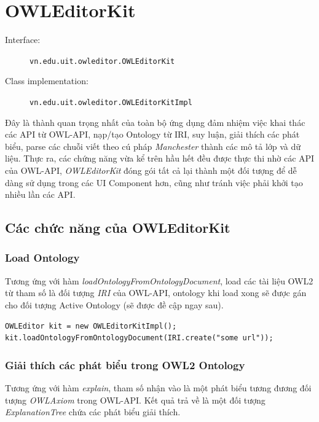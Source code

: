 \section{OWLEditorKit}
\begin{description}
\item[Interface:] \verb|vn.edu.uit.owleditor.OWLEditorKit|
\item[Class implementation:] \verb|vn.edu.uit.owleditor.OWLEditorKitImpl|
\end{description}
Đây là thành quan trọng nhất của toàn bộ ứng dụng đảm nhiệm việc khai thác các API từ OWL-API, nạp/tạo Ontology từ IRI, suy luận, giải thích các phát biểu, parse các chuỗi viết theo cú pháp \textit{Manchester} thành các mô tả lớp và dữ liệu. Thực ra, các chứng năng vừa kể trên hầu hết đều được thực thi nhờ các API của OWL-API, \textit{OWLEditorKit} đóng gói tất cả lại thành một đối tượng để dễ dàng sử dụng trong các UI Component hơn, cũng như tránh việc phải khởi tạo nhiều lần các API.
\subsection{Các chức năng của OWLEditorKit}

\subsubsection{Load Ontology}
Tương ứng với hàm \textit{loadOntologyFromOntologyDocument}, load các tài liệu OWL2 từ tham số là đối tượng \textit{IRI} của OWL-API, ontology khi load xong sẽ được gán cho đối tượng Active Ontology (sẽ được đề cập ngay sau).
\begin{verbatim}
OWLEditor kit = new OWLEditorKitImpl();
kit.loadOntologyFromOntologyDocument(IRI.create("some url"));
\end{verbatim}
\subsubsection{Giải thích các phát biểu trong OWL2 Ontology}
Tương ứng với hàm \textit{explain}, tham số nhận vào là một phát biểu tương đương đối tượng \textit{OWLAxiom} trong OWL-API. Kết quả trả về là một đối tượng \textit{ExplanationTree} chứa các phát biểu giải thích.

